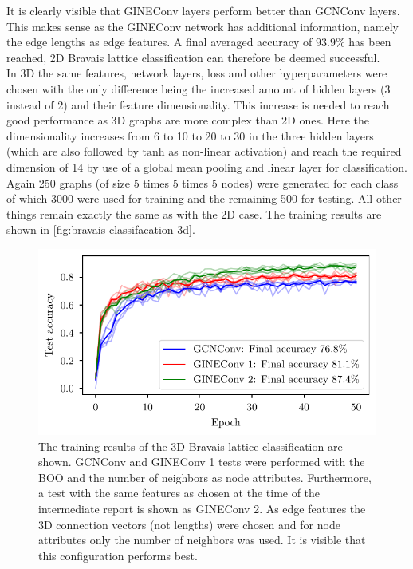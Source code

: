\documentclass[11pt,a4paper]{article}
\begin{document}
It is clearly visible that GINEConv layers perform better than GCNConv layers. 
This makes sense as the GINEConv network has additional information, namely the edge lengths as edge features. 
A final averaged accuracy of $93.9\%$ has been reached, 2D Bravais lattice classification can therefore be deemed successful. \\

In 3D the same features, network layers, loss and other hyperparameters were chosen with the only difference being the increased amount of hidden layers (3 instead of 2) and their feature dimensionality. 
This increase is needed to reach good performance as 3D graphs are more complex than 2D ones. 
Here the dimensionality increases from 6 to 10 to 20 to 30 in the three hidden layers (which are also followed by $\mathrm{tanh}$ as non-linear activation) and reach the required dimension of 14 by use of a global mean pooling and linear layer for classification. 
Again 250 graphs (of size 5 times 5 times 5 nodes) were generated for each class of which 3000 were used for training and the remaining 500 for testing. 
All other things remain exactly the same as with the 2D case. 
The training results are shown in \autoref{fig:bravais classifacation 3d}. 
\begin{figure}[htbp]
    \centering
    \includegraphics{images/plots/3d_classifier_results.pdf}
    \caption{The training results of the 3D Bravais lattice classification are shown. GCNConv and GINEConv 1 tests were performed with the BOO and the number of neighbors as node attributes. Furthermore, a test with the same features as chosen at the time of the intermediate report is shown as GINEConv 2. As edge features the 3D connection vectors (not lengths) were chosen and for node attributes only the number of neighbors was used. It is visible that this configuration performs best.}
    \label{fig:bravais classifacation 3d}
\end{figure}
\end{document}
